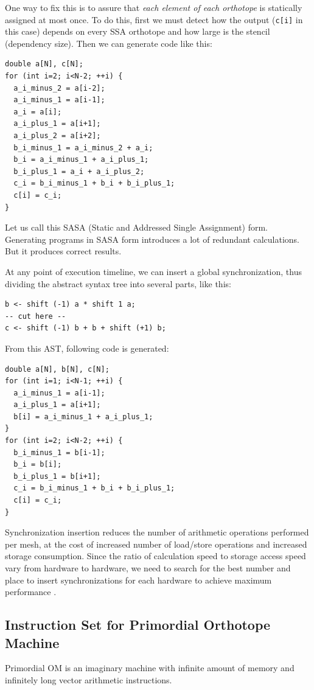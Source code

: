 \documentclass[twocolumn]{article}
\begin{document}
One way to fix this is to assure that {\em each element of each orthotope} is
statically assigned at most once. To do this, first we must detect how the
output ({\tt c[i]} in this case) depends on every SSA orthotope and how large
is the stencil (dependency size). Then we can generate code like this:
\begin{verbatim}
double a[N], c[N];
for (int i=2; i<N-2; ++i) {
  a_i_minus_2 = a[i-2];
  a_i_minus_1 = a[i-1];
  a_i = a[i];
  a_i_plus_1 = a[i+1];
  a_i_plus_2 = a[i+2];
  b_i_minus_1 = a_i_minus_2 + a_i;
  b_i = a_i_minus_1 + a_i_plus_1;
  b_i_plus_1 = a_i + a_i_plus_2;
  c_i = b_i_minus_1 + b_i + b_i_plus_1;
  c[i] = c_i;
}
\end{verbatim}
Let us call this SASA (Static and Addressed Single Assignment)
form. Generating programs in SASA form introduces a lot of redundant
calculations. But it produces correct results.

At any point of execution timeline, we can insert a global
synchronization, thus dividing the abstract syntax tree into several
parts, like this:

\begin{verbatim}
b <- shift (-1) a * shift 1 a;
-- cut here --
c <- shift (-1) b + b + shift (+1) b;
\end{verbatim}

From this AST, following code is generated:

\begin{verbatim}
double a[N], b[N], c[N];
for (int i=1; i<N-1; ++i) {
  a_i_minus_1 = a[i-1];
  a_i_plus_1 = a[i+1];
  b[i] = a_i_minus_1 + a_i_plus_1;
}
for (int i=2; i<N-2; ++i) {
  b_i_minus_1 = b[i-1];
  b_i = b[i];
  b_i_plus_1 = b[i+1];
  c_i = b_i_minus_1 + b_i + b_i_plus_1;
  c[i] = c_i;
}
\end{verbatim}

Synchronization insertion reduces the number of arithmetic operations
performed per mesh, at the cost of increased number of load/store
operations and increased storage consumption. Since the ratio of
calculation speed to storage access speed vary from hardware to
hardware, we need to search for the best number and place to insert
synchronizations for each hardware to achieve maximum performance .




\subsection{Instruction Set for Primordial Orthotope Machine}
Primordial OM is an imaginary machine with infinite amount of memory and
infinitely long vector arithmetic instructions. 
\end{document}
